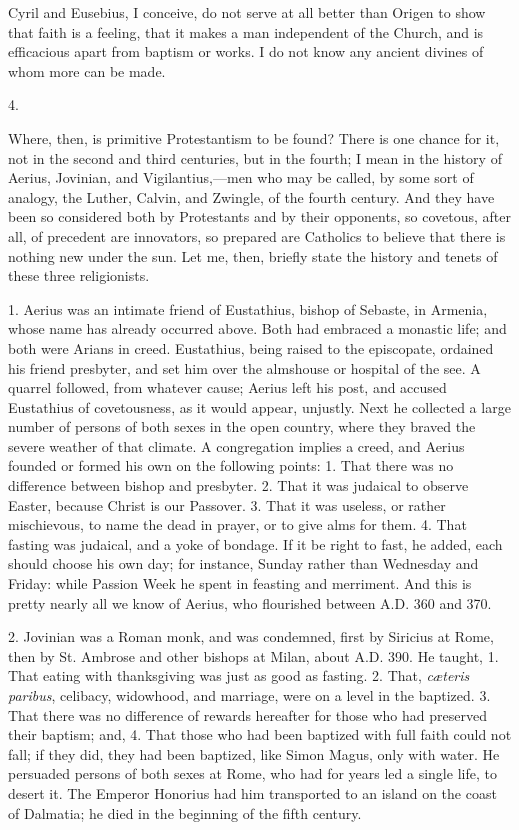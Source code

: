 Cyril and Eusebius, I conceive, do not serve at all better than
Origen to show that faith is a feeling, that it makes a man
independent of the Church, and is efficacious apart from baptism or
works. I do not know any ancient divines of whom more can be made.

4.

Where, then, is primitive Protestantism to be found? There is one
chance for it, not in the second and third centuries, but in the
fourth; I mean in the history of Aerius, Jovinian, and Vigilantius,—men
who may be called, by some sort of analogy, the Luther, Calvin, and
Zwingle, of the fourth century. And they have been so considered both
by Protestants and by their opponents, so covetous, after all, of
precedent are innovators, so prepared are Catholics to believe that
there is nothing new under the sun. Let me, then, briefly state the
history and tenets of these three religionists.

1. Aerius was an intimate friend of Eustathius, bishop of Sebaste,
in Armenia, whose name has already occurred above. Both had embraced a
monastic life; and both were Arians in creed. Eustathius, being raised
to the episcopate, ordained his friend presbyter, and set him over the
almshouse or hospital of the see. A quarrel followed, from whatever
cause; Aerius left his post, and accused Eustathius of covetousness,
as it would appear, unjustly. Next he collected a large number of
persons of both sexes in the open country, where they braved the
severe weather of that climate. A congregation implies a creed, and
Aerius founded or formed his own on the following points: 1. That
there was no difference between bishop and presbyter. 2. That it was
judaical to observe Easter, because Christ is our Passover. 3. That it
was useless, or rather mischievous, to name the dead in prayer, or to
give alms for them. 4. That fasting was judaical, and a yoke of
bondage. If it be right to fast, he added, each should choose his own
day; for instance, Sunday rather than Wednesday and Friday: while
Passion Week he spent in feasting and merriment. And this is
pretty nearly all we know of Aerius, who flourished between A.D.
360 and 370.

2. Jovinian was a Roman monk, and was condemned, first by Siricius
at Rome, then by St. Ambrose and other bishops at Milan, about A.D.
390. He taught, 1. That eating with thanksgiving was just as good as
fasting. 2. That, \emph{cæteris paribus}, celibacy, widowhood, and
marriage, were on a level in the baptized. 3. That there was no
difference of rewards hereafter for those who had preserved their
baptism; and, 4. That those who had been baptized with full faith
could not fall; if they did, they had been baptized, like Simon Magus,
only with water. He persuaded persons of both sexes at Rome, who had
for years led a single life, to desert it. The Emperor Honorius had
him transported to an island on the coast of Dalmatia; he died in the
beginning of the fifth century.


